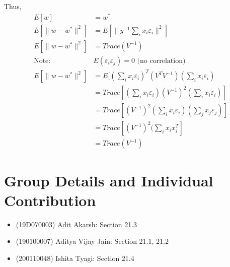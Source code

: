 \documentclass[11pt, twosides]{article}
\begin{document}
Thus, 
\begin{align*}
    E[w] &= w^*\\
    E[\|w-w^*\|^2] &= E[\|y^{-1}\sum_i x_i \varepsilon_i\|^2]\\
    E[\|w-w^*\|^2] &=Trace(V^{-1})\\
    \mbox{Note: }& E(\varepsilon_i \varepsilon_j) = 0 \mbox{ (no correlation)}\\
     E[\|w-w^*\|^2] &=E[(\sum_i x_i \varepsilon_i)^T (V^T V^{-1})(\sum_i x_i \varepsilon_i)\\
     &= Trace[(\sum_i x_i \varepsilon_i) (V^{-1})^2 (\sum_i x_i \varepsilon_i)]\\
     &= Trace[ (V^{-1})^2(\sum_i x_i \varepsilon_i) (\sum_j x_j \varepsilon_j)]\\
     &= Trace[ (V^{-1})^2(\sum_i x_ix_i^T]\\
     &= Trace(V^{-1})
\end{align*}






\section{Group Details and Individual Contribution}
\begin{itemize}
    \item (19D070003) Adit Akarsh: Section 21.3
    \item (190100007) Aditya Vijay Jain:  Section 21.1, 21.2
    \item (200110048) Ishita Tyagi: Section 21.4
\end{itemize}
\end{document}
